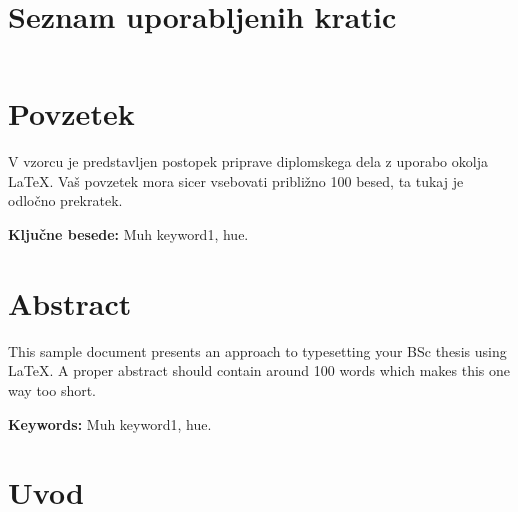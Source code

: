 \documentclass[a4paper, 12pt]{book}
\newcommand{\tkeywords}{Muh keyword1, hue}
\newcommand{\tkeywordsEn}{Muh keyword1, hue}
\newcommand{\clearemptydoublepage}{\newpage{\pagestyle{empty}\cleardoublepage}}
\begin{document}
\clearemptydoublepage


\chapter*{Seznam uporabljenih kratic}

\begin{tabular}{l|l|l}
\end{tabular}



\clearemptydoublepage

\chapter*{Povzetek}
V vzorcu je predstavljen postopek priprave diplomskega dela z uporabo okolja \LaTeX. Vaš povzetek mora sicer vsebovati približno 100 besed, ta tukaj je odločno prekratek.
\bigskip

\noindent\textbf{Ključne besede: } \tkeywords.
\clearemptydoublepage

\chapter*{Abstract}
This sample document presents an approach to typesetting your BSc thesis using \LaTeX. A proper abstract should contain around 100 words which makes this one way too short.
\bigskip

\noindent\textbf{Keywords:} \tkeywordsEn.
\clearemptydoublepage

\mainmatter
\setcounter{page}{1}
\pagestyle{fancy}

\chapter{Uvod}
\textcolor{red}{}
\end{document}

